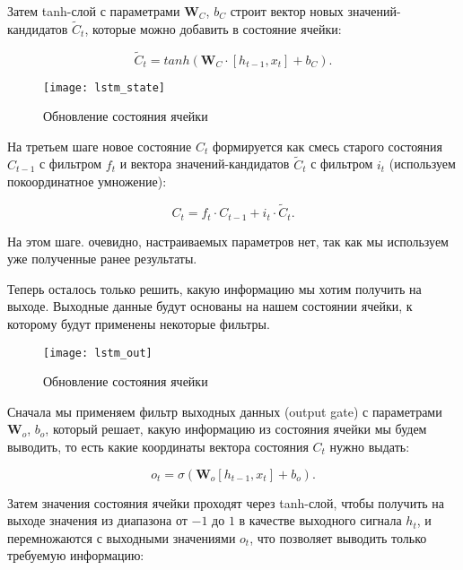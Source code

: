 \documentclass[specialist,
               substylefile = spbu.rtx,
               subf, 
               colorlinks=true, 12pt]{disser}
\begin{document}
Затем tanh-слой с параметрами $\mathbf{W}_C$, $b_C$ строит вектор новых значений-кандидатов $\widetilde{C}_t$, которые можно добавить в состояние ячейки:

\begin{equation*}
\widetilde{C}_t = tanh(\mathbf{W}_C \cdot [h_{t-1},x_t] + b_C).
\end{equation*}

\begin{figure}[!h]
\begin{center}
\texttt{[image: lstm\_state]}
\end{center}
\caption{Обновление состояния ячейки}
\end{figure}


На третьем шаге новое состояние $C_t$  формируется как смесь старого состояния $C_{t-1}$ с фильтром $f_t$ и вектора значений-кандидатов $ \widetilde{C}_t$ с фильтром $i_t$ (используем покоординатное умножение):

\begin{equation*}
C_t = f_t\cdot C_{t-1} + i_t\cdot \widetilde{C}_t.
\end{equation*}

На этом шаге. очевидно, настраиваемых параметров нет, так как мы используем уже полученные ранее результаты.


Теперь осталось только решить, какую информацию мы хотим получить на выходе. Выходные данные будут основаны на нашем состоянии ячейки, к которому будут применены некоторые фильтры.

\begin{figure}[!h]
\begin{center}
\texttt{[image: lstm\_out]}
\end{center}
\caption{Обновление состояния ячейки}
\end{figure}


Сначала мы применяем фильтр выходных данных (output gate) с параметрами $\mathbf{W}_o$, $b_o$, который решает, какую информацию из состояния ячейки мы будем выводить, то есть какие координаты вектора состояния $C_t$ нужно выдать:

\begin{equation}
o_t = \sigma(\mathbf{W}_o[h_{t-1},x_t] + b_o).
\label{eq:o_t}
\end{equation}


Затем значения состояния ячейки проходят через tanh-слой, чтобы получить на выходе значения из диапазона от $-1$ до $1$ в качестве выходного сигнала $h_t$, и перемножаются с выходными значениями $o_t$, что позволяет выводить только требуемую информацию:
\end{document}
